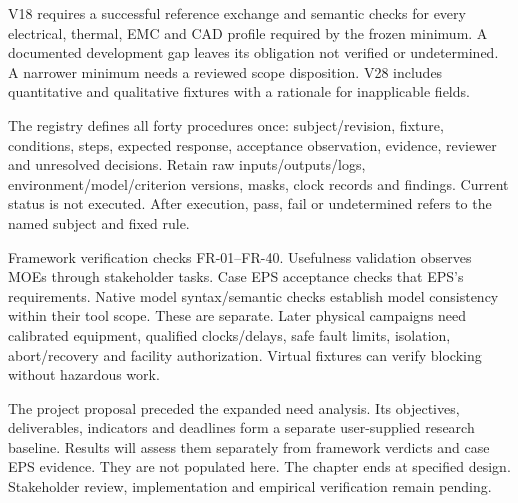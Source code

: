 V18 requires a successful reference exchange and semantic checks for every electrical, thermal, EMC and CAD profile required by the frozen minimum. A documented development gap leaves its obligation not verified or undetermined. A narrower minimum needs a reviewed scope disposition. V28 includes quantitative and qualitative fixtures with a rationale for inapplicable fields.

The registry defines all forty procedures once: subject/revision, fixture, conditions, steps, expected response, acceptance observation, evidence, reviewer and unresolved decisions. Retain raw inputs/outputs/logs, environment/model/criterion versions, masks, clock records and findings. Current status is not executed. After execution, pass, fail or undetermined refers to the named subject and fixed rule.

Framework verification checks FR-01--FR-40. Usefulness validation observes MOEs through stakeholder tasks. Case EPS acceptance checks that EPS's requirements. Native model syntax/semantic checks establish model consistency within their tool scope. These are separate. Later physical campaigns need calibrated equipment, qualified clocks/delays, safe fault limits, isolation, abort/recovery and facility authorization. Virtual fixtures can verify blocking without hazardous work.

The project proposal preceded the expanded need analysis. Its objectives, deliverables, indicators and deadlines form a separate user-supplied research baseline. Results will assess them separately from framework verdicts and case EPS evidence. They are not populated here. The chapter ends at specified design. Stakeholder review, implementation and empirical verification remain pending.
